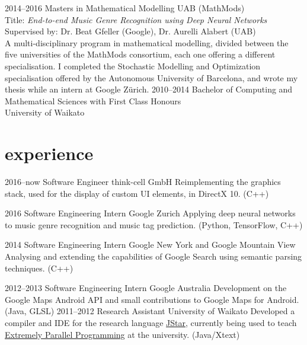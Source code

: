 \documentclass[]{boris-cv}
\begin{document}
\begin{entrylist}
  \entry
    {2014--2016}
    {Masters in Mathematical Modelling }
    {UAB (MathMods)}
    {\vspace{-2.5mm} \\ Title: \textit{End-to-end Music Genre Recognition using Deep Neural Networks}\\
    \footnotesize{Supervised by: Dr. Beat Gfeller (Google), Dr. Aurelli Alabert (UAB)}\\
    A multi-disciplinary program in mathematical modelling, divided between
    the five universities of the MathMods consortium, each one offering a
    different specialisation. I completed the Stochastic Modelling and Optimization
    specialisation offered by the Autonomous University of Barcelona,
    and wrote my thesis while an intern at Google Z\"{u}rich.}
  \entry
    {2010--2014}
    {Bachelor of Computing and Mathematical Sciences with First Class Honours \\}
    {University of Waikato}
	{\vspace{-5mm}}%
\end{entrylist}

\section{experience}

\begin{entrylist}
  \entry
    {2016--now}
    {Software Engineer}
    {think-cell GmbH}
    {Reimplementing the graphics stack, used for the display of custom
        UI elements, in DirectX 10. (C++)}

  \entry
    {2016}
    {Software Engineering Intern}
    {Google Zurich}
    {Applying deep neural networks to music genre recognition and music tag
		prediction. (Python, TensorFlow, C++)}

  \entry
    {2014}
    {Software Engineering Intern}
    {Google New York and Google Mountain View}
    {Analysing and extending the capabilities of Google Search
    using semantic parsing techniques. (C++)}

  \entry
    {2012--2013}
    {Software Engineering Intern}
    {Google Australia}
    {Development on the Google Maps Android API
    and small contributions to Google Maps for Android. (Java, GLSL)}
  \entry
    {2011--2012}
    {Research Assistant}
    {University of Waikato}
    {Developed a compiler and IDE for the research language
    \href{http://www.cs.waikato.ac.nz/research/jstar/}{JStar}, currently being used to teach
    \href{http://papers.waikato.ac.nz/subjects/COMP/COMP553}
    {Extremely Parallel Programming} at the university. (Java/Xtext)}

\end{entrylist}
\end{document}
